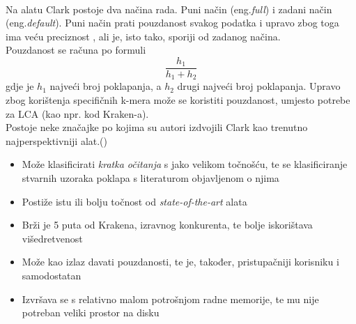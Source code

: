 \documentclass[times, utf8, seminar]{fer}
\begin{document}
\\Na alatu Clark postoje dva načina rada. Puni način (eng.\textit{full}) i zadani način (eng.\textit{default}). Puni način prati pouzdanost svakog podatka i upravo zbog toga ima veću preciznost , ali je, isto tako, sporiji od zadanog načina.
\\Pouzdanost se računa po formuli $$\dfrac{h_{1}}{h_{1}+h_{2}}$$ gdje je $h_{1}$ najveći broj poklapanja, a $h_{2}$ drugi najveći broj poklapanja.
Upravo zbog korištenja specifičnih k-mera može se koristiti pouzdanost, umjesto potrebe za LCA (kao npr. kod Kraken-a).
\\Postoje neke značajke po kojima su autori izdvojili Clark kao trenutno najperspektivniji alat.(\cite{CLARK})
\begin{itemize}
	\item Može klasificirati \textit{kratka očitanja} s jako velikom točnošću, te se klasificiranje stvarnih uzoraka poklapa s literaturom objavljenom o njima
	\item Postiže istu ili bolju točnost od \textit{state-of-the-art} alata
	\item Brži je 5 puta od Krakena, izravnog konkurenta, te bolje iskorištava višedretvenost
	\item Može kao izlaz davati pouzdanosti, te je, također, pristupačniji korisniku i samodostatan
	\item Izvršava se s relativno malom potrošnjom radne memorije, te mu nije potreban veliki prostor na disku 
\end{itemize}
\end{document}

